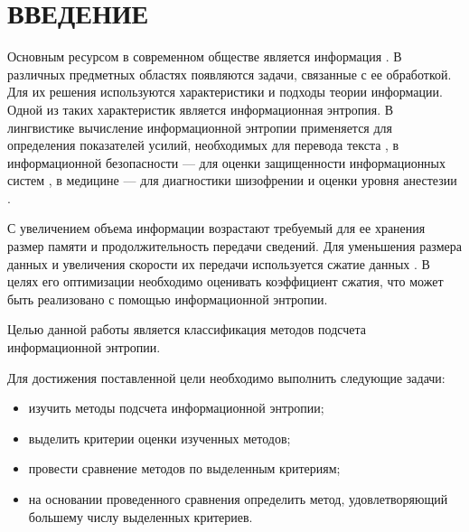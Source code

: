 \chapter*{ВВЕДЕНИЕ}

Основным ресурсом в современном обществе является информация \cite{society}. В различных предметных областях появляются задачи, связанные с ее обработкой. Для их решения используются характеристики и подходы теории информации. Одной из таких характеристик является информационная энтропия. В лингвистике вычисление информационной энтропии применяется для определения показателей усилий, необходимых для перевода текста \cite{translation}, в информационной безопасности --- для оценки защищенности информационных систем \cite{security}, в медицине --- для диагностики шизофрении \cite{mind} и оценки уровня анестезии \cite{anesthesia}.

С увеличением объема информации возрастают требуемый для ее хранения размер памяти и продолжительность передачи сведений. Для уменьшения размера данных и увеличения скорости их передачи используется сжатие данных \cite{data-compression}. В целях его оптимизации необходимо оценивать коэффициент сжатия, что может быть реализовано с помощью информационной энтропии.

Целью данной работы является классификация методов подсчета информационной энтропии.

Для достижения поставленной цели необходимо выполнить следующие задачи:

\begin{itemize}
	\item изучить методы подсчета информационной энтропии;
	\item выделить критерии оценки изученных методов;
	\item провести сравнение методов по выделенным критериям;
	\item на основании проведенного сравнения определить метод, удовлетворяющий большему числу выделенных критериев.	
\end{itemize}